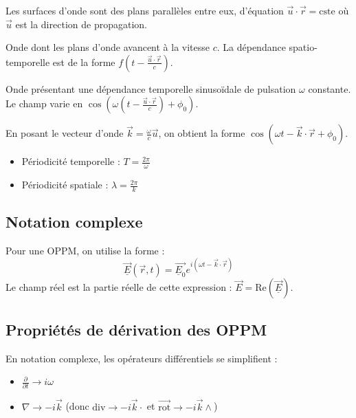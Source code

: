 \documentclass[french]{yLectureNote}
\renewcommand{\vec}{\overrightarrow}
\newcommand{\rot}{\vec{\mathrm{rot}}}
\begin{document}
\begin{theorem}
Les surfaces d'onde sont des plans parallèles entre eux, d'équation $\vec{u} \cdot \vec{r} = \text{cste}$ où $\vec{u}$ est la direction de propagation.
\end{theorem}

\begin{definition}
Onde dont les plans d'onde avancent à la vitesse $c$. La dépendance spatio-temporelle est de la forme $f(t - \frac{\vec{u} \cdot \vec{r}}{c})$.
\end{definition}

\begin{definition}
Onde présentant une dépendance temporelle sinusoïdale de pulsation $\omega$ constante. Le champ varie en $\cos(\omega(t - \frac{\vec{u} \cdot \vec{r}}{c}) + \phi_0)$.
\end{definition}

En posant le vecteur d'onde $\vec{k} = \frac{\omega}{c}\vec{u}$, on obtient la forme $\cos(\omega t - \vec{k} \cdot \vec{r} + \phi_0)$.
\begin{itemize}
    \item Périodicité temporelle : $T = \frac{2\pi}{\omega}$
    \item Périodicité spatiale : $\lambda = \frac{2\pi}{k}$
\end{itemize}

\subsection{Notation complexe}

Pour une OPPM, on utilise la forme :
$$\vec{\underline{E}}(\vec{r}, t) = \vec{\underline{E}_0} e^{i(\omega t - \vec{k} \cdot \vec{r})}$$
Le champ réel est la partie réelle de cette expression : $\vec{E} = \text{Re}(\vec{\underline{E}})$.

\subsection{Propriétés de dérivation des OPPM}

En notation complexe, les opérateurs différentiels se simplifient :
\begin{itemize}
    \item $\frac{\partial}{\partial t} \to i\omega$
    \item $\nabla \to -i\vec{k}$ (donc $\text{div} \to -i\vec{k} \cdot$ et $\rot \to -i\vec{k} \wedge$)
\end{itemize}
\end{document}
